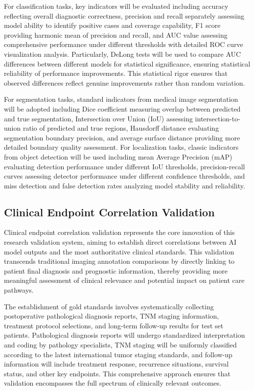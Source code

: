 For classification tasks, key indicators will be evaluated including accuracy reflecting overall diagnostic correctness, precision and recall separately assessing model ability to identify positive cases and coverage capability, F1 score providing harmonic mean of precision and recall, and AUC value assessing comprehensive performance under different thresholds with detailed ROC curve visualization analysis. Particularly, DeLong tests will be used to compare AUC differences between different models for statistical significance, ensuring statistical reliability of performance improvements. This statistical rigor ensures that observed differences reflect genuine improvements rather than random variation.

For segmentation tasks, standard indicators from medical image segmentation will be adopted including Dice coefficient measuring overlap between predicted and true segmentation, Intersection over Union (IoU) assessing intersection-to-union ratio of predicted and true regions, Hausdorff distance evaluating segmentation boundary precision, and average surface distance providing more detailed boundary quality assessment. For localization tasks, classic indicators from object detection will be used including mean Average Precision (mAP) evaluating detection performance under different IoU thresholds, precision-recall curves assessing detector performance under different confidence thresholds, and miss detection and false detection rates analyzing model stability and reliability.

\subsection{Clinical Endpoint Correlation Validation}

Clinical endpoint correlation validation represents the core innovation of this research validation system, aiming to establish direct correlations between AI model outputs and the most authoritative clinical standards. This validation transcends traditional imaging annotation comparisons by directly linking to patient final diagnosis and prognostic information, thereby providing more meaningful assessment of clinical relevance and potential impact on patient care pathways.

The establishment of gold standards involves systematically collecting postoperative pathological diagnosis reports, TNM staging information, treatment protocol selections, and long-term follow-up results for test set patients. Pathological diagnosis reports will undergo standardized interpretation and coding by pathology specialists, TNM staging will be uniformly classified according to the latest international tumor staging standards, and follow-up information will include treatment response, recurrence situations, survival status, and other key endpoints. This comprehensive approach ensures that validation encompasses the full spectrum of clinically relevant outcomes.

